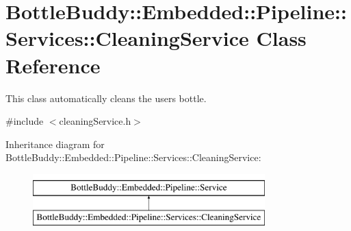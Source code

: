 \hypertarget{class_bottle_buddy_1_1_embedded_1_1_pipeline_1_1_services_1_1_cleaning_service}{}\section{Bottle\+Buddy\+:\+:Embedded\+:\+:Pipeline\+:\+:Services\+:\+:Cleaning\+Service Class Reference}
\label{class_bottle_buddy_1_1_embedded_1_1_pipeline_1_1_services_1_1_cleaning_service}


This class automatically cleans the users bottle.  




{\ttfamily \#include $<$cleaning\+Service.\+h$>$}

Inheritance diagram for Bottle\+Buddy\+:\+:Embedded\+:\+:Pipeline\+:\+:Services\+:\+:Cleaning\+Service\+:\begin{figure}[H]
\begin{center}
\leavevmode
\includegraphics[height=2.000000cm]{class_bottle_buddy_1_1_embedded_1_1_pipeline_1_1_services_1_1_cleaning_service}
\end{center}
\end{figure}
